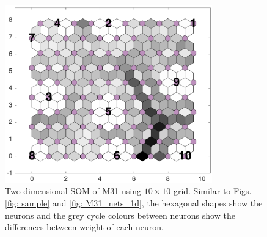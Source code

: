 \begin{figure}
        \centering
        \includegraphics[width=0.8\textwidth]{../../images0.01/M31/2D/diff_dimension/combine_2D_data_between_cols3and26.png}
    \caption[Two dimensional self-organizing map of M31 data]{Two dimensional SOM of M31 using $10\times10$ grid. Similar to Figs.\ref{fig: sample} and \ref{fig: M31_nets_1d}, the hexagonal shapes show the neurons and the grey cycle colours between neurons show the differences between weight of each neuron.}
    \label{fig: all_derived_ones}
\end{figure}
